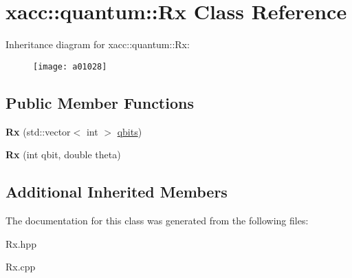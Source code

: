 \hypertarget{a01028}{}\section{xacc\+:\+:quantum\+:\+:Rx Class Reference}
\label{a01028}
Inheritance diagram for xacc\+:\+:quantum\+:\+:Rx\+:\begin{figure}[H]
\begin{center}
\leavevmode
\texttt{[image: a01028]}
\end{center}
\end{figure}
\subsection*{Public Member Functions}
\begin{DoxyCompactItemize}
\item 
\mbox{\label{a01028_a03babfe938a6cbf7f744fcd31a52d92d}} 
{\bfseries Rx} (std\+::vector$<$ int $>$ \hyperlink{a00992_a2a56be6c2519ea65df4d06f4abae1393}{qbits})
\item 
\mbox{\label{a01028_a01667b11d34d5621b98ebff9a07d9bbf}} 
{\bfseries Rx} (int qbit, double theta)
\end{DoxyCompactItemize}
\subsection*{Additional Inherited Members}


The documentation for this class was generated from the following files\+:\begin{DoxyCompactItemize}
\item 
Rx.\+hpp\item 
Rx.\+cpp\end{DoxyCompactItemize}
